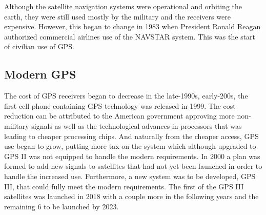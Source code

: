 \vspace{0.6cm} 
Although the satellite navigation systems were operational and orbiting the earth, they were still used mostly by the military and the receivers were expensive. However, this began to change in 1983 when President Ronald Reagan authorized commercial airlines use of the NAVSTAR system. This was the start of civilian use of GPS. \cite{HistGPSProgram}
\par
\vspace{0.6cm} 
\subsection{Modern GPS}
The cost of GPS receivers began to decrease in the late-1990s, early-200s, the first cell phone containing GPS technology was released in 1999. The cost reduction can be attributed to the American government approving more non-military signals as well as the technological advances in processors that was leading to cheaper processing chips. And naturally from the cheaper access, GPS use began to grow, putting more tax on the system which although upgraded to GPS II was not equipped to handle the modern requirements. In 2000 a plan was formed to add new signals to satellites that had not yet been launched in order to handle the increased use. Furthermore, a new system was to be developed, GPS III, that could fully meet the modern requirements. The first of the GPS III satellites was launched in 2018 with a couple more in the following years and the remaining 6 to be launched by 2023. \cite{Aerospace2021}
